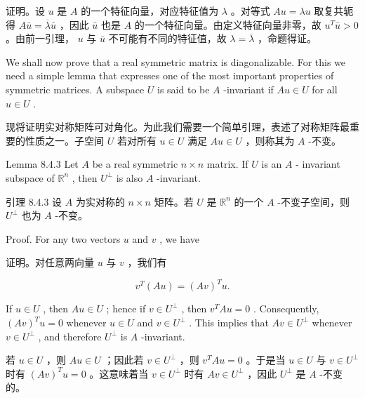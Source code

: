 \documentclass[10pt]{article}
\begin{document}
\begin{tcolorbox}\relax
证明。设 \(u\) 是 \(A\) 的一个特征向量，对应特征值为 \(\lambda\) 。对等式 \({Au} = {\lambda u}\) 取复共轭得 \(A\bar{u} = \overline{\lambda }\bar{u}\) ，因此 \(\bar{u}\) 也是 \(A\) 的一个特征向量。由定义特征向量非零，故 \({u}^{T}\bar{u} > 0\) 。由前一引理， \(u\) 与 \(\bar{u}\) 不可能有不同的特征值，故 \(\lambda  = \overline{\lambda }\) ，命题得证。
\end{tcolorbox}

We shall now prove that a real symmetric matrix is diagonalizable. For this we need a simple lemma that expresses one of the most important properties of symmetric matrices. A subspace \(U\) is said to be \(A\) -invariant if \({Au} \in  U\) for all \(u \in  U\) .

\begin{tcolorbox}\relax
现将证明实对称矩阵可对角化。为此我们需要一个简单引理，表述了对称矩阵最重要的性质之一。子空间 \(U\) 若对所有 \(u \in  U\) 满足 \({Au} \in  U\) ，则称其为 \(A\) -不变。
\end{tcolorbox}

Lemma 8.4.3 Let \(A\) be a real symmetric \(n \times  n\) matrix. If \(U\) is an \(A\) - invariant subspace of \({\mathbb{R}}^{n}\) , then \({U}^{ \bot  }\) is also \(A\) -invariant.

\begin{tcolorbox}\relax
引理 8.4.3 设 \(A\) 为实对称的 \(n \times  n\) 矩阵。若 \(U\) 是 \({\mathbb{R}}^{n}\) 的一个 \(A\) -不变子空间，则 \({U}^{ \bot  }\) 也为 \(A\) -不变。
\end{tcolorbox}

Proof. For any two vectors \(u\) and \(v\) , we have

\begin{tcolorbox}\relax
证明。对任意两向量 \(u\) 与 \(v\) ，我们有
\end{tcolorbox}

\[
{v}^{T}\left( {Au}\right)  = {\left( Av\right) }^{T}u.
\]

If \(u \in  U\) , then \({Au} \in  U\) ; hence if \(v \in  {U}^{ \bot  }\) , then \({v}^{T}{Au} = 0\) . Consequently, \({\left( Av\right) }^{T}u = 0\) whenever \(u \in  U\) and \(v \in  {U}^{ \bot  }\) . This implies that \({Av} \in  {U}^{ \bot  }\) whenever \(v \in  {U}^{ \bot  }\) , and therefore \({U}^{ \bot  }\) is \(A\) -invariant.

\begin{tcolorbox}\relax
若 \(u \in  U\) ，则 \({Au} \in  U\) ；因此若 \(v \in  {U}^{ \bot  }\) ，则 \({v}^{T}{Au} = 0\) 。于是当 \(u \in  U\) 与 \(v \in  {U}^{ \bot  }\) 时有 \({\left( Av\right) }^{T}u = 0\) 。这意味着当 \(v \in  {U}^{ \bot  }\) 时有 \({Av} \in  {U}^{ \bot  }\) ，因此 \({U}^{ \bot  }\) 是 \(A\) -不变的。
\end{tcolorbox}
\end{document}
